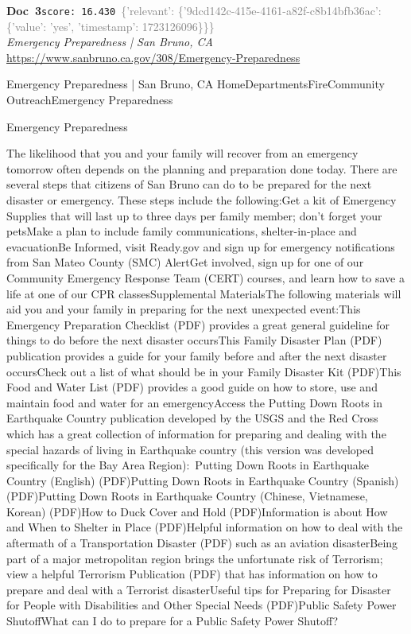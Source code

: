 \documentclass[a4paper,11pt]{article}
\begin{document}
\begin{docenv}
{\footnotesize\textcolor{doccolor}{\textbf{Doc~3}}}\hfill{\tiny\texttt{score:~16.430}}\ {\tiny\textcolor{gray}{\{'relevant': \{'9dcd142c-415e-4161-a82f-c8b14bfb36ac': \{'value': 'yes', 'timestamp': 1723126096\}\}\}}}\\[3pt]
{\small\textit{Emergency Preparedness | San Bruno, CA}}\\[2pt]
{\tiny\url{https://www.sanbruno.ca.gov/308/Emergency-Preparedness}}\\[4pt]
{\footnotesize Emergency Preparedness | San Bruno, CA
HomeDepartmentsFireCommunity OutreachEmergency Preparedness



Emergency Preparedness	

The likelihood that you and your family will recover from an emergency tomorrow often depends on the planning and preparation done today. There are several steps that citizens of San Bruno can do to be prepared for the next disaster or emergency. These steps include the following:Get a kit of Emergency Supplies that will last up to three days per family member; don't forget your petsMake a plan to include family communications, shelter-in-place and evacuationBe Informed, visit Ready.gov and sign up for emergency notifications from San Mateo County (SMC) AlertGet involved, sign up for one of our Community Emergency Response Team (CERT) courses, and learn how to save a life at one of our CPR classesSupplemental MaterialsThe following materials will aid you and your family in preparing for the next unexpected event:This Emergency Preparation Checklist (PDF) provides a great general guideline for things to do before the next disaster occursThis Family Disaster Plan (PDF) publication provides a guide for your family before and after the next disaster occursCheck out a list of what should be in your Family Disaster Kit (PDF)This Food and Water List (PDF) provides a good guide on how to store, use and maintain food and water for an emergencyAccess the Putting Down Roots in Earthquake Country publication developed by the USGS and the Red Cross which has a great collection of information for preparing and dealing with the special hazards of living in Earthquake country (this version was developed specifically for the Bay Area Region): Putting Down Roots in Earthquake Country (English) (PDF)Putting Down Roots in Earthquake Country (Spanish) (PDF)Putting Down Roots in Earthquake Country (Chinese, Vietnamese, Korean) (PDF)How to Duck Cover and Hold (PDF)Information is about How and When to Shelter in Place (PDF)Helpful information on how to deal with the aftermath of a Transportation Disaster (PDF) such as an aviation disasterBeing part of a major metropolitan region brings the unfortunate risk of Terrorism; view a helpful Terrorism Publication (PDF) that has information on how to prepare and deal with a Terrorist disasterUseful tips for Preparing for Disaster for People with Disabilities and Other Special Needs (PDF)Public Safety Power ShutoffWhat can I do to prepare for a Public Safety Power Shutoff?}
\end{docenv}
\end{document}
